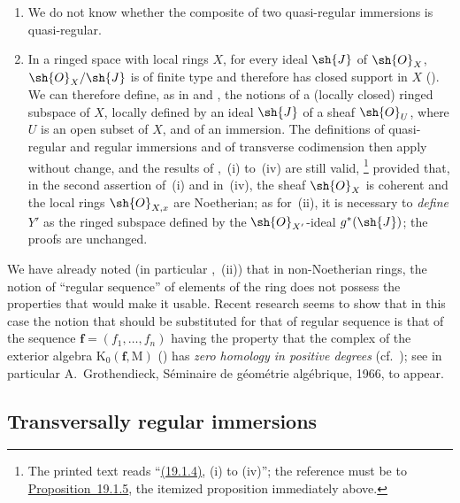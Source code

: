 \begin{remarks}[19.1.7]
\label{IV.19.1.7}
\medskip\noindent
\begin{enumerate}[label=(\roman*)]
  \item We do not know whether the composite of two quasi-regular immersions is quasi-regular.
  \item In a ringed space with local rings $X$, for every ideal $\sh{J}$ of $\sh{O}_X$, $\sh{O}_X/\sh{J}$ is of finite type and therefore has closed support in $X$ ().
We can therefore define, as in  and , the notions of a (locally closed) ringed subspace of $X$, locally defined by an ideal $\sh{J}$ of a sheaf $\sh{O}_U$, where $U$ is an open subset of $X$, and of an immersion.
The definitions of quasi-regular and regular immersions and of transverse codimension then apply without change, and the results of ,~(i) to~(iv) are still valid,
\footnote{The printed text reads ``{\hyperlink{ega4.c04.prop.19-1-4}{(19.1.4)}}, (i) to (iv)''; the reference must be to {\hyperlink{ega4.c04.prop.19-1-5}{Proposition~19.1.5}}, the itemized proposition immediately above.}
provided that, in the second assertion of~(i) and in~(iv), the sheaf $\sh{O}_X$ is coherent and the local rings $\sh{O}_{X,x}$ are Noetherian; as for~(ii), it is necessary to \emph{define} $Y'$ as the ringed subspace defined by the $\sh{O}_{X'}$-ideal $g^*(\sh{J})$; the proofs are unchanged.
\end{enumerate}
\end{remarks}

\begin{env}[19.1.8]
\label{IV.19.1.8}
We have already noted (in particular ,~(ii)) that in non-Noetherian rings, the notion of ``regular sequence'' of elements of the ring does not possess the properties that would make it usable.
Recent research seems to show that in this case the notion that should be substituted for that of regular sequence is that of the sequence $\mathbf{f}=(f_1,\ldots,f_n)$ having the property that the complex of the exterior algebra $\mathrm{K}_0(\mathbf{f},\mathrm{M})$ () has \emph{zero homology in positive degrees} (cf.\ ); see in particular A.~Grothendieck, S\'eminaire de g\'eom\'etrie alg\'ebrique, 1966, to appear.
\end{env}

\subsection{Transversally regular immersions}
\label{subsection:IV.19.2}

